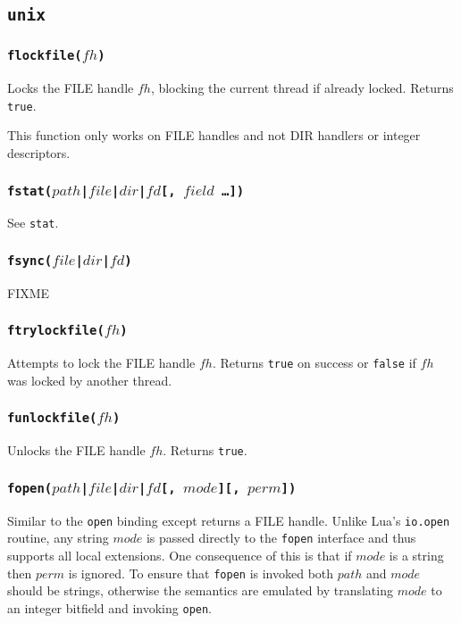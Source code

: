\documentclass[11pt, oneside]{memoir}
\newcommand*{\true}[0]{\texttt{true}\xspace}
\newcommand*{\false}[0]{\texttt{false}\xspace}
\newcommand*{\syscall}[1]{\texttt{#1}\xspace}
\newcommand*{\fn}[1]{\texttt{#1}\xspace}
\newcounter{toccols}
\newenvironment{Module}[1]{
	\subsection{\texttt{#1}}
	\addtocontents{toc}{
		\protect\begin{multicols}{\value{toccols}}
	}
}{
	\addtocontents{toc}{\protect\end{multicols}}
}
\begin{document}
\begin{Module}{unix}
\subsubsection[\fn{flockfile}]{\fn{flockfile($fh$)}}

Locks the FILE handle $fh$, blocking the current thread if already locked. Returns \true.

This function only works on FILE handles and not DIR handlers or integer descriptors.

\subsubsection[\fn{fstat}]{\fn{fstat($path$|$file$|$dir$|$fd$[, $field$ \ldots])}}

See \fn{stat}.

\subsubsection[\fn{fsync}]{\fn{fsync($file$|$dir$|$fd$)}}

FIXME

\subsubsection[\fn{ftrylockfile}]{\fn{ftrylockfile($fh$)}}

Attempts to lock the FILE handle $fh$. Returns \true on success or \false if $fh$ was locked by another thread.

\subsubsection[\fn{funlockfile}]{\fn{funlockfile($fh$)}}

Unlocks the FILE handle $fh$. Returns \true.

\subsubsection[\fn{fopen}]{\fn{fopen($path$|$file$|$dir$|$fd$[, $mode$][, $perm$])}}

Similar to the \syscall{open} binding except returns a FILE handle. Unlike Lua's \texttt{io.open} routine,
any string $mode$ is passed directly to the \syscall{fopen} interface and thus supports all local extensions. One consequence of this is that if $mode$ is a string then $perm$ is ignored. To ensure that \syscall{fopen} is invoked both $path$ and $mode$ should be strings, otherwise the semantics are emulated by translating $mode$ to an integer bitfield and invoking \syscall{open}.


\end{Module}
\end{document}
